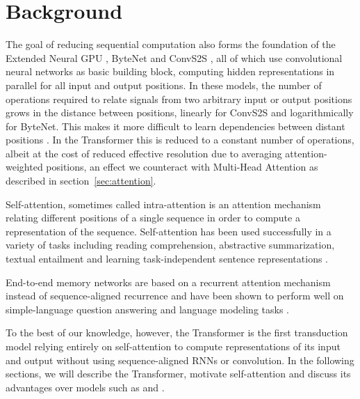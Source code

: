 \documentclass{article}
\begin{document}
\section{Background}


The goal of reducing sequential computation also forms the foundation of the Extended Neural GPU \citep{extendedngpu}, ByteNet \citep{NalBytenet2017} and ConvS2S \citep{JonasFaceNet2017}, all of which use convolutional neural networks as basic building block, computing hidden representations in parallel for all input and output positions. In these models, the number of operations required to relate signals from two arbitrary input or output positions grows in the distance between positions, linearly for ConvS2S and logarithmically for ByteNet. This makes it more difficult to learn dependencies between distant positions \citep{hochreiter2001gradient}. In the Transformer this is reduced to a constant number of operations, albeit at the cost of reduced effective resolution due to averaging attention-weighted positions, an effect we counteract with Multi-Head Attention as described in section~\ref{sec:attention}. 

Self-attention, sometimes called intra-attention is an attention mechanism relating different positions of a single sequence in order to compute a representation of the sequence. Self-attention has been used successfully in a variety of tasks including reading comprehension, abstractive summarization, textual entailment and learning task-independent sentence representations \citep{cheng2016long, decomposableAttnModel, paulus2017deep, lin2017structured}.

End-to-end memory networks are based on a recurrent attention mechanism instead of sequence-aligned recurrence and have been shown to perform well on simple-language question answering and language modeling tasks \citep{sukhbaatar2015}.

To the best of our knowledge, however, the Transformer is the first transduction model relying entirely on self-attention to compute representations of its input and output without using sequence-aligned RNNs or convolution.
In the following sections, we will describe the Transformer, motivate self-attention and discuss its advantages over models such as \citep{neural_gpu, NalBytenet2017} and \citep{JonasFaceNet2017}.


\end{document}
